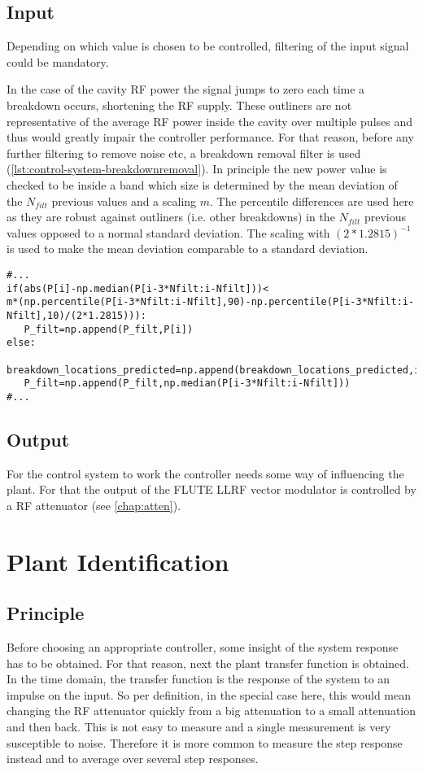\subsection{Input}
Depending on which value is chosen to be controlled, filtering of the input signal could be mandatory.

In the case of the cavity RF power the signal jumps to zero each time a breakdown occurs, shortening the RF supply. These outliners are not representative of the average RF power inside the cavity over multiple pulses and thus would greatly impair the controller performance. For that reason, before any further filtering to remove noise etc, a breakdown removal filter is used (\autoref{lst:control-system-breakdownremoval}). In principle the new power value is checked to be inside a band which size is determined by the mean deviation of the $N_{filt}$ previous values and a scaling $m$. The percentile differences are used here as they are robust against outliners (i.e. other breakdowns) in the $N_{filt}$ previous values opposed to a normal standard deviation. The scaling with $(2*1.2815)^{-1}$ is used to make the mean deviation comparable to a standard deviation.

\begin{lstlisting}[style=python,caption = Breakdown removal, label = lst:control-system-breakdownremoval]
#...
if(abs(P[i]-np.median(P[i-3*Nfilt:i-Nfilt]))<
m*(np.percentile(P[i-3*Nfilt:i-Nfilt],90)-np.percentile(P[i-3*Nfilt:i-Nfilt],10)/(2*1.2815))):
   P_filt=np.append(P_filt,P[i])
else:
   breakdown_locations_predicted=np.append(breakdown_locations_predicted,i)
   P_filt=np.append(P_filt,np.median(P[i-3*Nfilt:i-Nfilt]))
#...
\end{lstlisting}




\subsection{Output}
For the control system to work the controller needs some way of influencing the plant. For that the output of the FLUTE LLRF vector modulator is controlled by a RF attenuator (see \autoref{chap:atten}).

\section{Plant Identification}
\subsection{Principle}
Before choosing an appropriate controller, some insight of the system response has to be obtained. For that reason, next the plant transfer function is obtained. In the time domain, the transfer function is the response of the system to an impulse on the input. So per definition, in the special case here, this would mean changing the RF attenuator quickly from a big attenuation to a small attenuation and then back. This is not easy to measure and a single measurement is very susceptible to noise. Therefore it is more common to measure the step response instead and to average over several step responses.

